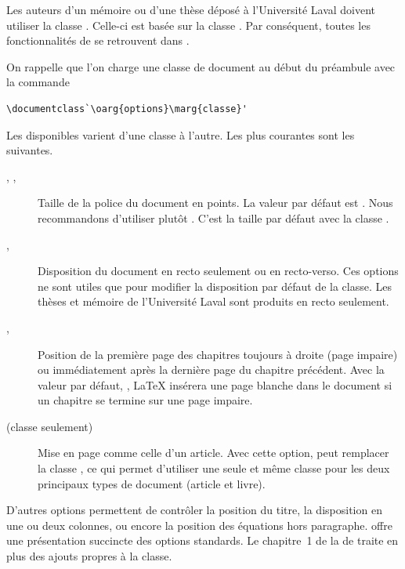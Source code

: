Les auteurs d'un mémoire ou d'une thèse déposé à l'Université Laval
doivent utiliser la classe  \citep{ulthese}. Celle-ci
est basée sur la classe . Par conséquent, toutes les
fonctionnalités de  se retrouvent dans .

On rappelle que l'on charge une classe de document au début du
préambule avec la commande
\begin{lstlisting}
\documentclass`\oarg{options}\marg{classe}'
\end{lstlisting}
Les  disponibles varient d'une classe à l'autre. Les
plus courantes sont les suivantes.
\begin{description}
\item[\mdseries \code{10pt}, \code{11pt}, \code{12pt}] Taille de la
  police du document en points. La valeur par défaut est \code{10pt}.
  Nous recommandons d'utiliser plutôt \code{11pt}. C'est la taille par
  défaut avec la classe .
\item[\mdseries {}, ] Disposition du
  document en recto seulement ou en recto-verso. Ces options ne sont
  utiles que pour modifier la disposition par défaut de la classe. Les
  thèses et mémoire de l'Université Laval sont produits en recto
  seulement.
\item[\mdseries {}, ] Position de la
  première page des chapitres toujours à droite (page impaire) ou
  immédiatement après la dernière page du chapitre précédent. Avec la
  valeur par défaut, , {\LaTeX} insérera une page
  blanche dans le document si un chapitre se termine sur une page
  impaire.
\item[\mdseries {} (classe  seulement)] Mise
  en page comme celle d'un article. Avec cette option, 
  peut remplacer la classe , ce qui permet d'utiliser
  une seule et même classe pour les deux principaux types de document
  (article et livre).
\end{description}

D'autres options permettent de contrôler la position du titre, la
disposition en une ou deux colonnes, ou encore la position des
équations hors paragraphe. \citet{Thurnherr:class-options} offre une
présentation succincte des options standards. Le chapitre~1 de la %
de  traite en plus des ajouts propres à la classe.



